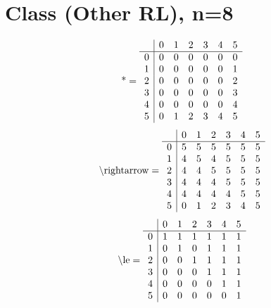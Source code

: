 \documentclass[11pt]{article}
\begin{document}
\section{Class (Other RL), n=8}
\[\text{*} = 
\begin{array}{r | r r r r r r}
 & 0 & 1 & 2 & 3 & 4 & 5 \\ \hline
0 & 0 & 0 & 0 & 0 & 0 & 0 \\
1 & 0 & 0 & 0 & 0 & 0 & 1 \\
2 & 0 & 0 & 0 & 0 & 0 & 2 \\
3 & 0 & 0 & 0 & 0 & 0 & 3 \\
4 & 0 & 0 & 0 & 0 & 0 & 4 \\
5 & 0 & 1 & 2 & 3 & 4 & 5 \\
\end{array}
\]
\[\text{\textbackslash rightarrow} = 
\begin{array}{r | r r r r r r}
 & 0 & 1 & 2 & 3 & 4 & 5 \\ \hline
0 & 5 & 5 & 5 & 5 & 5 & 5 \\
1 & 4 & 5 & 4 & 5 & 5 & 5 \\
2 & 4 & 4 & 5 & 5 & 5 & 5 \\
3 & 4 & 4 & 4 & 5 & 5 & 5 \\
4 & 4 & 4 & 4 & 4 & 5 & 5 \\
5 & 0 & 1 & 2 & 3 & 4 & 5 \\
\end{array}
\]
\[\text{\textbackslash le} = 
\begin{array}{r | r r r r r r}
 & 0 & 1 & 2 & 3 & 4 & 5 \\ \hline
0 & 1 & 1 & 1 & 1 & 1 & 1 \\
1 & 0 & 1 & 0 & 1 & 1 & 1 \\
2 & 0 & 0 & 1 & 1 & 1 & 1 \\
3 & 0 & 0 & 0 & 1 & 1 & 1 \\
4 & 0 & 0 & 0 & 0 & 1 & 1 \\
5 & 0 & 0 & 0 & 0 & 0 & 1 \\
\end{array}
\]
\end{document}
